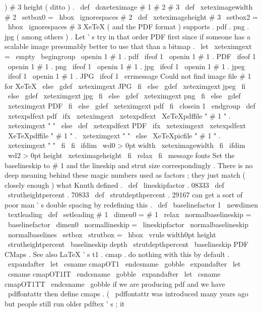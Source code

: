 {{{)
#
3
height
(
ditto
)
.
\
def
\
doxeteximage
#
1
#
2
#
3
{
%
\
def
\
xeteximagewidth
{
#
2
}
\
setbox0
=
\
hbox
{
\
ignorespaces
#
2
}
%
\
def
\
xeteximageheight
{
#
3
}
\
setbox2
=
\
hbox
{
\
ignorespaces
#
3
}
%
%
%
XeTeX
(
and
the
PDF
format
)
supports
.
pdf
.
png
.
jpg
(
among
%
others
)
.
Let
'
s
try
in
that
order
PDF
first
since
if
%
someone
has
a
scalable
image
presumably
better
to
use
that
than
a
%
bitmap
.
\
let
\
xeteximgext
=
\
empty
\
begingroup
\
openin
1
#
1
.
pdf
\
ifeof
1
\
openin
1
#
1
.
PDF
\
ifeof
1
\
openin
1
#
1
.
png
\
ifeof
1
\
openin
1
#
1
.
jpg
\
ifeof
1
\
openin
1
#
1
.
jpeg
\
ifeof
1
\
openin
1
#
1
.
JPG
\
ifeof
1
\
errmessage
{
Could
not
find
image
file
#
1
for
XeTeX
}
%
\
else
\
gdef
\
xeteximgext
{
JPG
}
%
\
fi
\
else
\
gdef
\
xeteximgext
{
jpeg
}
%
\
fi
\
else
\
gdef
\
xeteximgext
{
jpg
}
%
\
fi
\
else
\
gdef
\
xeteximgext
{
png
}
%
\
fi
\
else
\
gdef
\
xeteximgext
{
PDF
}
%
\
fi
\
else
\
gdef
\
xeteximgext
{
pdf
}
%
\
fi
\
closein
1
\
endgroup
%
\
def
\
xetexpdfext
{
pdf
}
%
\
ifx
\
xeteximgext
\
xetexpdfext
\
XeTeXpdffile
"
#
1
"
.
\
xeteximgext
"
"
\
else
\
def
\
xetexpdfext
{
PDF
}
%
\
ifx
\
xeteximgext
\
xetexpdfext
\
XeTeXpdffile
"
#
1
"
.
\
xeteximgext
"
"
\
else
\
XeTeXpicfile
"
#
1
"
.
\
xeteximgext
"
"
\
fi
\
fi
\
ifdim
\
wd0
>
0pt
width
\
xeteximagewidth
\
fi
\
ifdim
\
wd2
>
0pt
height
\
xeteximageheight
\
fi
\
relax
}
\
fi
%
\
message
{
fonts
}
%
Set
the
baselineskip
to
#
1
and
the
lineskip
and
strut
size
%
correspondingly
.
There
is
no
deep
meaning
behind
these
magic
numbers
%
used
as
factors
;
they
just
match
(
closely
enough
)
what
Knuth
defined
.
%
\
def
\
lineskipfactor
{
.
08333
}
\
def
\
strutheightpercent
{
.
70833
}
\
def
\
strutdepthpercent
{
.
29167
}
%
%
can
get
a
sort
of
poor
man
'
s
double
spacing
by
redefining
this
.
\
def
\
baselinefactor
{
1
}
%
\
newdimen
\
textleading
\
def
\
setleading
#
1
{
%
\
dimen0
=
#
1
\
relax
\
normalbaselineskip
=
\
baselinefactor
\
dimen0
\
normallineskip
=
\
lineskipfactor
\
normalbaselineskip
\
normalbaselines
\
setbox
\
strutbox
=
\
hbox
{
%
\
vrule
width0pt
height
\
strutheightpercent
\
baselineskip
depth
\
strutdepthpercent
\
baselineskip
}
%
}
%
PDF
CMaps
.
See
also
LaTeX
'
s
t1
.
cmap
.
%
%
do
nothing
with
this
by
default
.
\
expandafter
\
let
\
csname
cmapOT1
\
endcsname
\
gobble
\
expandafter
\
let
\
csname
cmapOT1IT
\
endcsname
\
gobble
\
expandafter
\
let
\
csname
cmapOT1TT
\
endcsname
\
gobble
%
if
we
are
producing
pdf
and
we
have
\
pdffontattr
then
define
cmaps
.
%
(
\
pdffontattr
was
introduced
many
years
ago
but
people
still
run
%
older
pdftex
'
s
;
it
}}}

